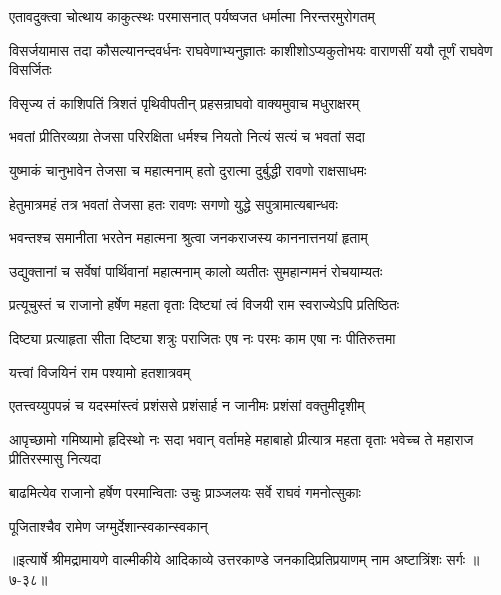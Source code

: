 \twolineshloka
{एतावदुक्त्वा चोत्थाय काकुत्स्थः परमासनात्}
{पर्यष्वजत धर्मात्मा निरन्तरमुरोगतम्} %

\threelineshloka
{विसर्जयामास तदा कौसल्यानन्दवर्धनः}
{राघवेणाभ्यनुज्ञातः काशीशोऽप्यकुतोभयः}
{वाराणसीं ययौ तूर्णं राघवेण विसर्जितः} %

\twolineshloka
{विसृज्य तं काशिपतिं त्रिशतं पृथिवीपतीन्}
{प्रहसन्राघवो वाक्यमुवाच मधुराक्षरम्} %

\twolineshloka
{भवतां प्रीतिरव्यग्रा तेजसा परिरक्षिता}
{धर्मश्च नियतो नित्यं सत्यं च भवतां सदा} %

\twolineshloka
{युष्माकं चानुभावेन तेजसा च महात्मनाम्}
{हतो दुरात्मा दुर्बुद्धी रावणो राक्षसाधमः} %

\twolineshloka
{हेतुमात्रमहं तत्र भवतां तेजसा हतः}
{रावणः सगणो युद्धे सपुत्रामात्यबान्धवः} %

\twolineshloka
{भवन्तश्च समानीता भरतेन महात्मना}
{श्रुत्वा जनकराजस्य काननात्तनयां हृताम्} %

\twolineshloka
{उद्युक्तानां च सर्वेषां पार्थिवानां महात्मनाम्}
{कालो व्यतीतः सुमहान्गमनं रोचयाम्यतः} %

\twolineshloka
{प्रत्यूचुस्तं च राजानो हर्षेण महता वृताः}
{दिष्ट्यां त्वं विजयी राम स्वराज्येऽपि प्रतिष्ठितः} %

\twolineshloka
{दिष्ट्या प्रत्याहृता सीता दिष्ट्या शत्रुः पराजितः}
{एष नः परमः काम एषा नः पीतिरुत्तमा} %

\onelineshloka
{यत्त्वां विजयिनं राम पश्यामो हतशात्रवम्} %

\twolineshloka
{एतत्त्वय्युपपन्नं च यदस्मांस्त्वं प्रशंससे}
{प्रशंसार्ह न जानीमः प्रशंसां वक्तुमीदृशीम्} %

\threelineshloka
{आपृच्छामो गमिष्यामो हृदिस्थो नः सदा भवान्}
{वर्तामहे महाबाहो प्रीत्यात्र महता वृताः}
{भवेच्च ते महाराज प्रीतिरस्मासु नित्यदा} %

\twolineshloka
{बाढमित्येव राजानो हर्षेण परमान्विताः}
{उचुः प्राञ्जलयः सर्वे राघवं गमनोत्सुकाः} %

\onelineshloka
{पूजिताश्चैव रामेण जग्मुर्देशान्स्वकान्स्वकान्} %


॥इत्यार्षे श्रीमद्रामायणे वाल्मीकीये आदिकाव्ये उत्तरकाण्डे जनकादिप्रतिप्रयाणम् नाम अष्टात्रिंशः सर्गः ॥७-३८॥
